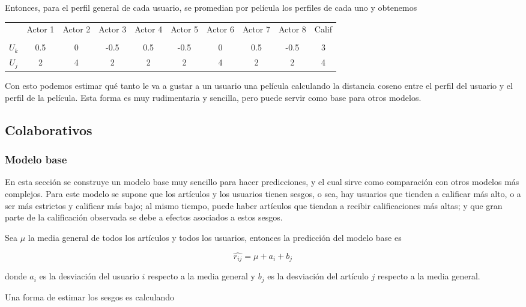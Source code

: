 Entonces, para el perfil general de cada usuario, se promedian por película los perfiles de cada uno y obtenemos

\begin{center}
\begin{tabular}{ c | c  c c c c c c c c}
    & Actor 1 & Actor 2 & Actor 3 & Actor 4 & Actor 5 & Actor 6 & Actor 7 & Actor 8 & Calif \\ \\
  \hline                       
$U_k$ & 0.5 & 0 & -0.5 & 0.5 & -0.5 & 0 & 0.5 & -0.5 & 3 \\
$U_j$ & 2 & 4 & 2 & 2 & 2 & 4 & 2 & 2 & 4 \\
  \hline  
\end{tabular}
\end{center}

Con esto podemos estimar qué tanto le va a gustar a un usuario una película calculando la distancia coseno entre el perfil del usuario y el perfil de la película. Esta forma es muy rudimentaria y sencilla, pero puede servir como base para otros modelos.

\subsection{Colaborativos}

\subsubsection{Modelo base} \label{sec:modelo_base}

En esta sección se construye un modelo base muy sencillo para hacer predicciones, y el cual sirve como comparación con otros modelos más complejos. Para este modelo se supone que los artículos y los usuarios tienen sesgos, o sea, hay usuarios que tienden a calificar más alto, o a ser más estrictos y calificar más bajo; al mismo tiempo, puede haber artículos que tiendan a recibir calificaciones más altas; y que gran parte de la calificación observada se debe a efectos asociados a estos sesgos.

Sea $\mu$ la media general de todos los artículos y todos los usuarios, entonces la predicción del modelo base es

\[
\hat{r_{ij}} = \mu + a_i + b_j
\]

donde $a_i$ es la desviación del usuario $i$ respecto a la media general y $b_j$ es la desviación del artículo $j$ respecto a la media general.

Una forma de estimar los sesgos es calculando

